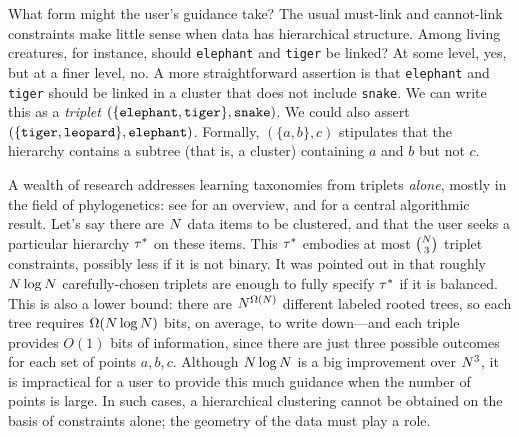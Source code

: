 What form might the user's guidance take? The usual must-link and cannot-link constraints make little sense when data has hierarchical structure. Among living creatures, for instance, should {\tt elephant} and {\tt tiger} be linked? At some level, yes, but at a finer level, no. A more straightforward assertion is that {\tt elephant} and {\tt tiger} should be linked in a cluster that does not include {\tt snake}. We can write this as a {\it triplet} $(\{\mbox{\tt elephant}, \mbox{\tt tiger}\}, \mbox{\tt snake})$. We could also assert $(\{\mbox{\tt tiger}, \mbox{\tt leopard}\}, \mbox{\tt elephant})$. Formally, $(\{a,b\},c)$ stipulates that the hierarchy contains a subtree (that is, a cluster) containing $a$ and $b$ but not $c$.

A wealth of research addresses learning taxonomies from triplets {\it alone}, mostly in the field of phylogenetics: see \citet{Felsenstein2004} for an overview, and \citet{Aho1981} for a central algorithmic result. Let's say there are $N$ data items to be clustered, and that the user seeks a particular hierarchy $\tau^*$ on these items. This $\tau^*$ embodies at most ${N \choose 3}$ triplet constraints, possibly less if it is not binary. It was pointed out in \citet{Tamuz2011} that roughly $N \log N$ carefully-chosen triplets are enough to fully specify $\tau^*$ if it is balanced. This is also a lower bound: there are $N^{\Omega(N)}$ different labeled rooted trees, so each tree requires $\Omega(N \log N)$ bits, on average, to write down---and each triple provides $O(1)$ bits of information, since there are just three possible outcomes for each set of points $a,b,c$. Although $N \log N$ is a big improvement over $N^3$, it is impractical for a user to provide this much guidance when the number of points is large. In such cases, a hierarchical clustering cannot be obtained on the basis of constraints alone; the geometry of the data must play a role.

